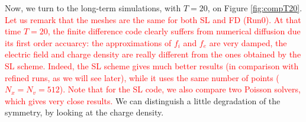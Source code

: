 \documentclass{article}
\numberwithin{equation}{section}
\begin{document}
Now, we turn to the long-term simulations, with $T=20$, on Figure \ref{fig:compT20}.  %
%
\textcolor{red}{Let us remark that the meshes are the same for both SL and FD (Run0). At that time $T=20$, 
the finite difference code clearly suffers from numerical diffusion due its first order accuarcy: 
the approximations of $f_i$ and $f_e$ are very damped, 
the electric field and charge density are really different from the ones obtained by the SL scheme. 
Indeed, the SL scheme gives much better results (in comparison with refined runs, as we will see later), 
while it uses the same number of points ($N_x=N_v=512$).  
Note that for the SL code, we also compare two Poisson solvers, which gives very close results. }
 We can distinguish a little degradation of the symmetry, by looking at the charge density.
%
\end{document}

